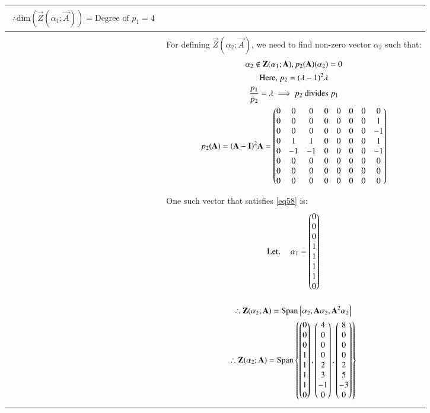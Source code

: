 \documentclass[journal,12pt]{IEEEtran}
\begin{document}
\begin{longtable}{|p{4cm}|p{14cm}|}
\begin{gather}
        \therefore \text{dim}(\vec{Z}(\alpha_1;\vec{A}))= \text{Degree of $p_1$}=4
        \end{gather}\\
        \hline
        &\\
        &For defining $\vec{Z}(\alpha_2;\vec{A})$, we need to find non-zero vector $\alpha_2$ such that: 
        \begin{gather}
        \alpha_2 \notin \mathbf{Z}(\alpha_1;\mathbf{A}),p_2(\mathbf{A})(\alpha_2)=0 \label{eq58}\\
        \text{Here, }p_2=(\lambda-1)^2\lambda \\
        \frac{p_1}{p_2}=\lambda \implies p_2 \text{ divides }p_1 \\
        p_2(\mathbf{A})=(\mathbf{A}-\mathbf{I})^2\mathbf{A}=\begin{pmatrix} 0&  0&  0& 0& 0& 0& 0&  0\\
 0&  0&  0& 0& 0& 0& 0&  1\\
 0&  0&  0& 0& 0& 0& 0& -1\\
 0&  1&  1& 0& 0& 0& 0&  1\\
 0& -1& -1& 0& 0& 0& 0& -1\\
 0&  0&  0& 0& 0& 0& 0&  0\\
 0&  0&  0& 0& 0& 0& 0&  0\\
 0&  0&  0& 0& 0& 0& 0&  0\end{pmatrix}
        \end{gather}\\
         & One such vector that satisfies \eqref{eq58} is:
        \begin{gather}
        \text{Let,  } \quad \alpha_1=\begin{pmatrix}0\\0\\0\\1\\1\\1\\1\\0\end{pmatrix}
        \end{gather}\\
        &\begin{gather}
        \therefore \vec{Z}(\alpha_2;\vec{A})=\text{Span}\cbrak{\alpha_2,\vec{A}\alpha_2,\vec{A}^{2}\alpha_2}\\
         \therefore \vec{Z}(\alpha_2;\vec{A})=\text{Span}\cbrak{\myvec{0\\0\\0\\1\\1\\1\\1\\0},\myvec{4\\0\\0\\0\\2\\3\\-1\\0},\myvec{8\\0\\0\\0\\2\\5\\-3\\0}}\\

\end{gather}
\end{longtable}
\end{document}
